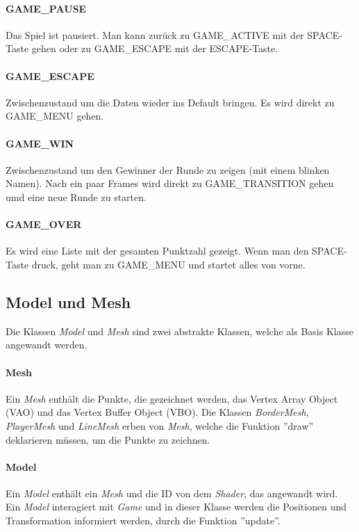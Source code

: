\documentclass[doktyp=studarbeit]{TUBAFarbeiten}
\begin{document}
\paragraph{GAME\_PAUSE}
Das Spiel ist pausiert. Man kann zurück zu GAME\_ACTIVE mit der SPACE-Taste
gehen oder zu GAME\_ESCAPE mit der ESCAPE-Taste.
\paragraph{GAME\_ESCAPE}
Zwischenzustand um die Daten wieder ins Default bringen. Es wird direkt zu 
GAME\_MENU gehen.
\paragraph{GAME\_WIN}
Zwischenzustand um den Gewinner der Runde zu zeigen (mit einem blinken Namen).
Nach ein paar Frames wird direkt zu GAME\_TRANSITION gehen umd eine neue Runde
zu starten. 
\paragraph{GAME\_OVER}
Es wird eine Liste mit der gesamten Punktzahl gezeigt. Wenn man den SPACE-Taste
druck, geht man zu GAME\_MENU und startet alles von vorne.

\subsection{Model und Mesh}
Die Klassen \textit{Model} und \textit{Mesh} sind zwei abstrakte Klassen, welche
als Basis Klasse angewandt werden.

\paragraph{Mesh} 
Ein \textit{Mesh} enthält die Punkte, die gezeichnet werden, das 
Vertex Array Object (VAO) und das Vertex Buffer Object (VBO). 
Die Klassen \textit{BorderMesh}, \textit{PlayerMesh} und \textit{LineMesh} 
erben von \textit{Mesh}, welche die Funktion ''draw'' deklarieren müssen,
um die Punkte zu zeichnen.

\paragraph{Model} 
Ein \textit{Model} enthält ein \textit{Mesh} und die ID von dem \textit{Shader},
das angewandt wird. Ein \textit{Model} interagiert mit \textit{Game} und in
dieser Klasse werden die Positionen und Transformation informiert werden, 
durch die Funktion ''update''.
\end{document}
